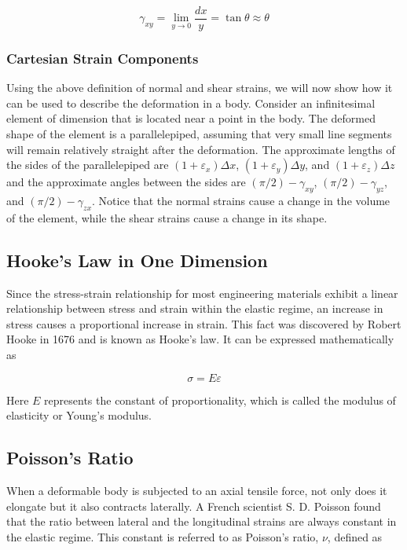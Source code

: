 \documentclass[
10pt,
a4paper,
openany,
svgnames,
]{book}
\begin{document}
\begin{equation}
  \gamma _{xy} = \mathop {\lim }\limits_{y \to 0} \frac{dx}{y} = \tan \theta  \approx \theta
\end{equation}
 
\subsubsection{Cartesian Strain Components}

Using the above definition of normal and shear strains, we will now show how it can be used to describe the deformation in a body. Consider an infinitesimal element of dimension that is located near a point in the body. The deformed shape of the element is a parallelepiped, assuming that very small line segments will remain relatively straight after the deformation. The approximate lengths of the sides of the parallelepiped are  $(1 + \varepsilon_x)\Delta x$, $(1 + \varepsilon_y)\Delta y$, and $(1 + \varepsilon_z)\Delta z$ and the approximate angles between the sides are $(\pi /2) - \gamma_{xy}$, $(\pi /2) - \gamma_{yz}$, and $(\pi /2) - \gamma _{zx}$. Notice that the normal strains cause a change in the volume of the element, while the shear strains cause a change in its shape.

\subsection{Hooke’s Law in One Dimension}

Since the stress-strain relationship for most engineering materials exhibit a linear relationship between stress and strain within the elastic regime, an increase in stress causes a proportional increase in strain. This fact was discovered by Robert Hooke in 1676 and is known as Hooke’s law. It can be expressed mathematically as

\begin{equation}
  \sigma  = E\varepsilon
\end{equation}

Here $E$ represents the constant of proportionality, which is called the modulus of elasticity or Young’s modulus.

\subsection{Poisson’s Ratio}

When a deformable body is subjected to an axial tensile force, not only does it elongate but it also contracts laterally. A French scientist S. D. Poisson found that the ratio between lateral and the longitudinal strains are always constant in the elastic regime. This constant is referred to as Poisson’s ratio, $\nu$, defined as
\end{document}
